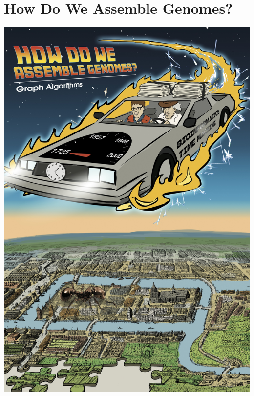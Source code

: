 \documentclass{article}
\begin{document}
\section{How Do We Assemble Genomes?\\ }
\begin{center}
    \includegraphics[scale=0.72]{c3/c3.jpg}
\end{center}
\pagebreak
\end{document}
